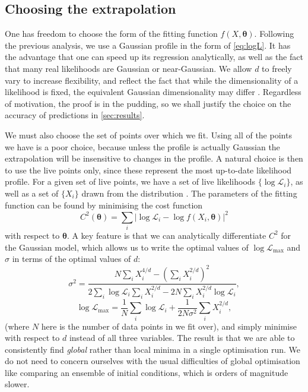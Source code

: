 \documentclass[usenatbib]{mnras}
\newcommand{\logL}{\{ \log \Like_i \}}
\newcommand{\thetab}{\bm{\theta}}
\newcommand{\logLm}{\log \Like_\mathrm{max}}
\newcommand{\set}[1]{\{#1\}}
\newcommand{\Like}{\mathcal{L}}
\begin{document}
\subsection{Choosing the extrapolation}
One has freedom to choose the form of the fitting function $f(X, \thetab)$. Following the previous analysis, we use a Gaussian profile in the form of \cref{eq:logL}. It has the advantage that one can speed up its regression analytically, as well as the fact that many real likelihoods are Gaussian or near-Gaussian. We allow $d$ to freely vary to increase flexibility, and reflect the fact that while the dimensionality of a likelihood is fixed, the equivalent Gaussian dimensionality may differ \citep{Handley_2019}. Regardless of motivation, the proof is in the pudding, so we shall justify the choice on the accuracy of predictions in \cref{sec:results}.
\par
We must also choose the set of points over which we fit. Using all of the points we have is a poor choice, because unless the profile is actually Gaussian the extrapolation will be insensitive to changes in the profile. A natural choice is then to use the live points only, since these represent the most up-to-date likelihood profile. For a given set of live points, we have a set of live likelihoods $\logL$, as well as a set of $\set{X_i}$ drawn from the distribution . The parameters of the fitting function can be found by minimising the cost function
\begin{equation}\label{chi squared}
	C^2(\thetab) = \sum_i \left| \log \Like_i - \log f(X_i, \thetab) \right| ^2
\end{equation}
with respect to $\thetab$. A key feature is that we can analytically differentiate  $C^2$ for the Gaussian model, which allows us to write the optimal values of $\logLm$ and $\sigma$ in terms of the optimal values of $d$:
\begin{equation}\label{eq:sigma}
    \sigma^2 = \frac{N \sum_i X_i^{4/d} - \left(\sum_i X_i^{2/d}\right)^2}{2 \sum_i \log \Like_i \sum_i X_i^{2/d} - 2N \sum_i X_i^{2/d}\log \Like_i },
\end{equation}
\begin{equation}\label{eq:logLm}
    \logLm = \frac{1}{N} \sum_i \log \mathcal{L}_i + \frac{1}{2N\sigma^2} \sum_i X_i^{2/d},
\end{equation}
(where $N$ here is the number of data points in we fit over), and simply minimise with respect to $d$ instead of all three variables. The result is that we are able to consistently find \textit{global} rather than local minima in a single optimisation run. We do not need to concern ourselves with the usual difficulties of global optimisation like comparing an ensemble of initial conditions, which is orders of magnitude slower.
\end{document}
